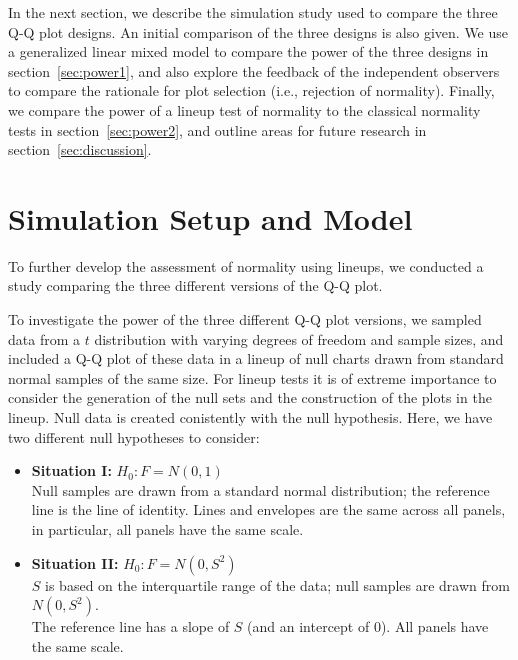 \documentclass{article}\usepackage[]{graphicx}\usepackage[]{color}
\begin{document}
In the next section, we describe the simulation study used to compare the three Q-Q plot designs. An initial comparison of the three designs is also given. We use a generalized linear mixed model to compare the power of the three designs in section~\ref{sec:power1}, and also explore the feedback of the independent observers to compare the rationale for plot selection (i.e., rejection of normality). Finally, we compare the power of a lineup test of normality to the classical normality tests in section~\ref{sec:power2}, and outline areas for future research in section~\ref{sec:discussion}. 



\section{Simulation Setup and Model}\label{sec:simu}

To further develop the assessment of normality using lineups, we conducted a study comparing the three different versions of the Q-Q plot.


To investigate the power of the three different Q-Q plot versions, we sampled data from a $t$ distribution with varying degrees of freedom and sample sizes, and included a Q-Q plot of these data in a lineup of null charts drawn from standard normal samples of the same size.
For lineup tests it is of extreme importance to consider the generation of the null sets and the construction of the plots in the lineup. 
Null data is created conistently with the null hypothesis. Here, we have two different null hypotheses to consider:

\begin{itemize}
\item{\bf Situation I:}
$H_0: F = N(0,1)$  \\
Null samples are drawn from a standard normal distribution; the reference line is the line of identity. Lines and envelopes are the same across all panels, in particular, all panels have the same scale. 
\item{\bf Situation II:} $H_0: F = N(0,S^2)$ \\
$S$ is based on the interquartile range of the data; null samples are drawn from $N(0, S^2)$. \\
The reference line has a slope of $S$ (and an intercept of 0).  All panels have the same scale. 
\end{itemize}
\end{document}
